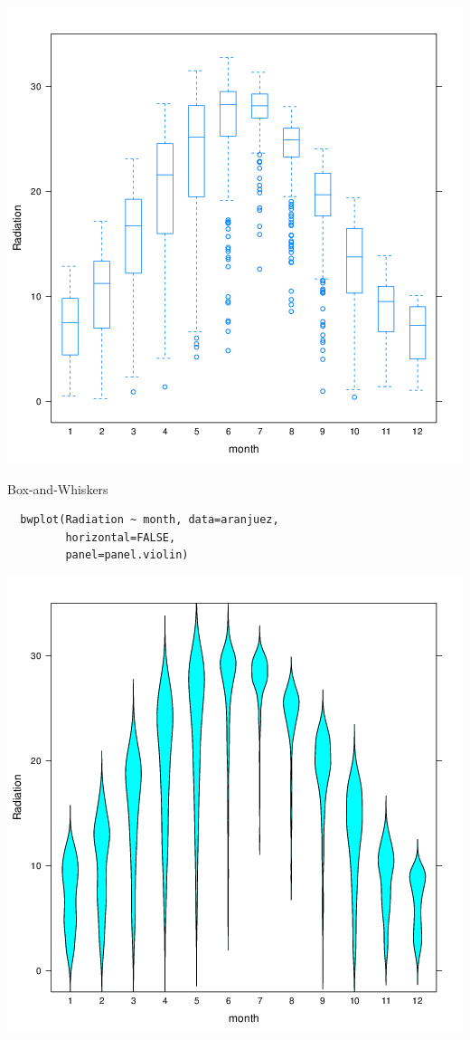 \documentclass[xcolor={usenames,svgnames,dvipsnames}]{beamer}
\begin{document}
\begin{frame}[label=sec-3-41]{}
\includegraphics[width=.9\linewidth]{figs/bwplot.png}
\end{frame}

\begin{frame}[fragile,label=sec-3-42]{Box-and-Whiskers}
 \lstset{language=R,label= ,caption= ,numbers=none}
\begin{lstlisting}
  bwplot(Radiation ~ month, data=aranjuez,
         horizontal=FALSE,
         panel=panel.violin)
\end{lstlisting}
\end{frame}

\begin{frame}[label=sec-3-43]{}
\includegraphics[width=.9\linewidth]{figs/violin.png}
\end{frame}
\end{document}
